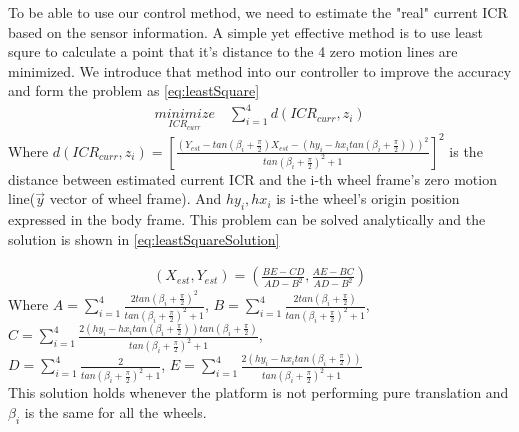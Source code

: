 To be able to use our control method, we need to estimate the "real" current ICR based on the sensor information. A simple yet effective method is to use least squre to calculate a point that it's distance to the 
4 zero motion lines are minimized\cite{ICRestimation}. We introduce that method into our controller to improve the accuracy and form the problem as \cref{eq:leastSquare}
\begin{equation}\label{eq:leastSquare}
	\begin{split}
		\underset{ICR_{curr}}{minimize} \quad \sum_{i=1}^{4} d(ICR_{curr},z_i)
	\end{split}
\end{equation}
Where $d(ICR_{curr},z_i)=[\frac{(Y_{est} - tan(\beta_i+\frac{\pi}{2})X_{est} - (hy_i-hx_itan(\beta_i+\frac{\pi}{2})))^2}{tan(\beta_i+\frac{\pi}{2})^2+1}]^2$ is the distance between estimated current ICR and the i-th wheel frame's zero motion line($\overrightarrow{y}$ vector of wheel frame). And $hy_i,hx_i$ is i-the wheel's origin position expressed in the body frame. This problem can be solved analytically and the solution is shown in \cref{eq:leastSquareSolution}

\begin{equation}\label{eq:leastSquareSolution}
	\begin{split}
		(X_{est},Y_{est})=(\frac{BE-CD}{AD-B^2},\frac{AE-BC}{AD-B^2})
	\end{split}
\end{equation}
Where $A=\sum_{i=1}^{4}\frac{2tan(\beta_i+\frac{\pi}{2})^2}{tan(\beta_i+\frac{\pi}{2})^2+1}$, $B=\sum_{i=1}^{4}\frac{2tan(\beta_i+\frac{\pi}{2})}{tan(\beta_i+\frac{\pi}{2})^2+1}$, \\
$C=\sum_{i=1}^{4}\frac{2(hy_i-hx_itan(\beta_i+\frac{\pi}{2}))tan(\beta_i+\frac{\pi}{2})}{tan(\beta_i+\frac{\pi}{2})^2+1}$,\\ $D=\sum_{i=1}^{4}\frac{2}{tan(\beta_i+\frac{\pi}{2})^2+1}$, 
$E =\sum_{i=1}^{4}\frac{2(hy_i-hx_itan(\beta_i+\frac{\pi}{2}))}{tan(\beta_i+\frac{\pi}{2})^2+1}$\\

This solution holds whenever the platform is not performing pure translation and $\beta_i$ is the same for all the wheels.



